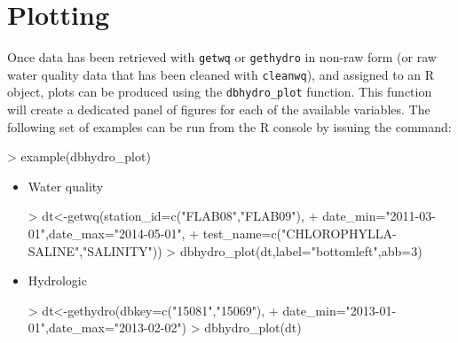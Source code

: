 \documentclass[12pt,notitlepage]{article}
\begin{document}
\section{Plotting}

Once data has been retrieved with \verb|getwq| or \texttt{gethydro} in non-raw form (or raw water quality data that has been cleaned with \verb|cleanwq|), and assigned to an R object, plots can be produced using the \verb|dbhydro_plot| function. This function will create a dedicated panel of figures for each of the available variables. The following set of examples can be run from the R console by issuing the command:

\begin{Schunk}
\begin{Sinput}
> example(dbhydro_plot)
\end{Sinput}
\end{Schunk}

\begin{itemize}

\item{Water quality}
\begin{Schunk}
\begin{Sinput}
> dt<-getwq(station_id=c("FLAB08","FLAB09"),
+                date_min="2011-03-01",date_max="2014-05-01",
+                test_name=c("CHLOROPHYLLA-SALINE","SALINITY"))
> dbhydro_plot(dt,label="bottomleft",abb=3)
\end{Sinput}
\end{Schunk}


\item{Hydrologic}
\begin{Schunk}
\begin{Sinput}
> dt<-gethydro(dbkey=c("15081","15069"),
+             date_min="2013-01-01",date_max="2013-02-02")
> dbhydro_plot(dt)
\end{Sinput}
\end{Schunk}
\end{itemize}
\end{document}
